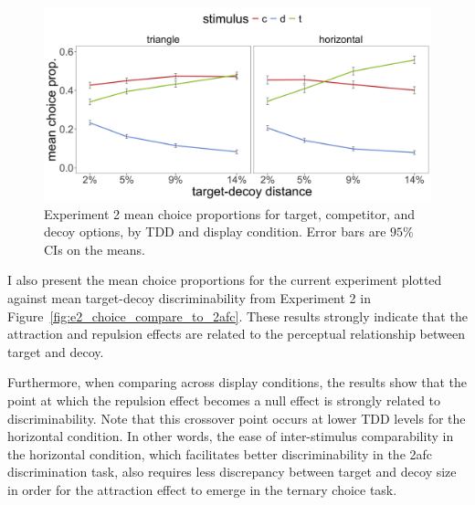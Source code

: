\begin{figure}
   \includegraphics[width=\textwidth]{figures/choicePhase_att_trials_mean_choice_props_collapsed.jpg}
   \caption{Experiment 2 mean choice proportions for target, competitor, and decoy options, by TDD and display condition. Error bars are $95\%$ CIs on the means.}
   \label{fig:e2_choiceprops}
\end{figure}

I also present the mean choice proportions for the current experiment plotted against mean target-decoy discriminability from Experiment 2 in Figure~\ref{fig:e2_choice_compare_to_2afc}. These results strongly indicate that the attraction and repulsion effects are related to the perceptual relationship between target and decoy. 

Furthermore, when comparing across display conditions, the results show that the point at which the repulsion effect becomes a null effect is strongly related to discriminability. Note that this crossover point occurs at lower TDD levels for the horizontal condition. In other words, the ease of inter-stimulus comparability in the horizontal condition, which facilitates better discriminability in the 2afc discrimination task, also requires less discrepancy between target and decoy size in order for the attraction effect to emerge in the ternary choice task.

